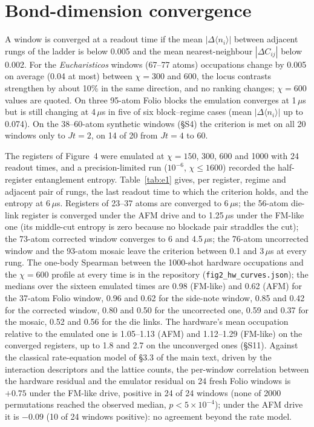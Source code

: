 \documentclass[11pt,a4paper]{article}
\begin{document}
\section{Bond-dimension convergence}
A window is converged at a readout time if the mean $|\Delta\langle n_i\rangle|$ between adjacent rungs of the ladder is below 0.005 and the mean nearest-neighbour $|\Delta C_{ij}|$ below 0.002. For the \emph{Eucharisticos} windows (67--77 atoms) occupations change by 0.005 on average (0.04 at most) between $\chi=300$ and 600, the locus contrasts strengthen by about 10\% in the same direction, and no ranking changes; $\chi=600$ values are quoted. On three 95-atom Folio blocks the emulation converges at 1\,$\mu$s but is still changing at 4\,$\mu$s in five of six block--regime cases (mean $|\Delta\langle n_i\rangle|$ up to 0.074). On the 38--60-atom synthetic windows (\S S4) the criterion is met on all 20 windows only to $Jt=2$, on 14 of 20 from $Jt=4$ to 60.

The registers of Figure~4 were emulated at $\chi=150$, 300, 600 and 1000 with 24 readout times, and a precision-limited run ($10^{-6}$, $\chi\le1600$) recorded the half-register entanglement entropy. Table~\ref{tab:e1} gives, per register, regime and adjacent pair of rungs, the last readout time to which the criterion holds, and the entropy at 6\,$\mu$s. Registers of 23--37 atoms are converged to 6\,$\mu$s; the 56-atom die-link register is converged under the AFM drive and to 1.25\,$\mu$s under the FM-like one (its middle-cut entropy is zero because no blockade pair straddles the cut); the 73-atom corrected window converges to 6 and 4.5\,$\mu$s; the 76-atom uncorrected window and the 93-atom mosaic leave the criterion between 0.1 and 3\,$\mu$s at every rung. The one-body Spearman between the 1000-shot hardware occupations and the $\chi=600$ profile at every time is in the repository (\texttt{fig2\_hw\_curves.json}); the medians over the sixteen emulated times are 0.98 (FM-like) and 0.62 (AFM) for the 37-atom Folio window, 0.96 and 0.62 for the side-note window, 0.85 and 0.42 for the corrected window, 0.80 and 0.50 for the uncorrected one, 0.59 and 0.37 for the mosaic, 0.52 and 0.56 for the die links. The hardware's mean occupation relative to the emulated one is 1.05--1.13 (AFM) and 1.12--1.29 (FM-like) on the converged registers, up to 1.8 and 2.7 on the unconverged ones (\S S11). Against the classical rate-equation model of \S 3.3 of the main text, driven by the interaction descriptors and the lattice counts, the per-window correlation between the hardware residual and the emulator residual on 24 fresh Folio windows is $+0.75$ under the FM-like drive, positive in 24 of 24 windows (none of 2000 permutations reached the observed median, $p<5\times10^{-4}$); under the AFM drive it is $-0.09$ (10 of 24 windows positive): no agreement beyond the rate model.
\end{document}
